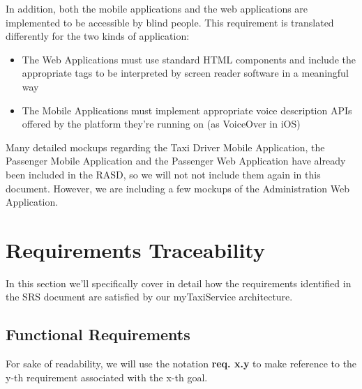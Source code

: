 In addition, both the mobile applications and the web applications are implemented to be accessible by blind people. This requirement is translated differently for the two kinds of application:
	\begin{itemize}
	\item The Web Applications must use standard HTML components and include the appropriate tags to be interpreted by screen reader software in a meaningful way
	\item The Mobile Applications must implement appropriate voice description APIs offered by the platform they're running on (as VoiceOver in iOS)
	\end{itemize}

Many detailed mockups regarding the Taxi Driver Mobile Application, the Passenger Mobile Application and the Passenger Web Application have already been included in the RASD, so we will not not include them again in this document. 
However, we are including a few mockups of the Administration Web Application. 


\chapter{Requirements Traceability}
In this section we'll specifically cover in detail how the requirements identified in the SRS document are satisfied by our myTaxiService architecture. 

\section{Functional Requirements}

For sake of readability, we will use the notation \textbf{req. x.y} to make reference to the y-th requirement associated with the x-th goal.

